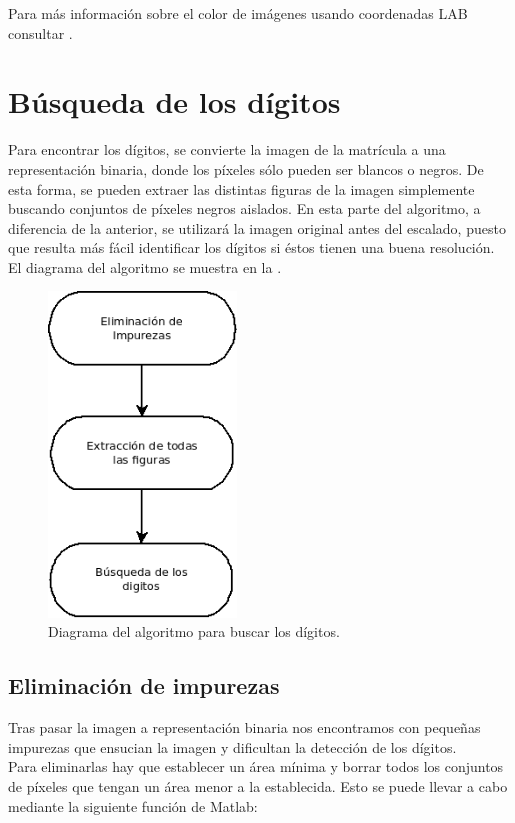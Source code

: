 Para más información sobre el color de imágenes usando coordenadas LAB consultar \cite{matlabLAB}.

\section{Búsqueda de los dígitos}
Para encontrar los dígitos, se convierte la imagen de la matrícula a una representación binaria, donde los píxeles sólo pueden ser blancos o negros. De esta forma, se pueden extraer las distintas figuras de la imagen simplemente buscando conjuntos de píxeles negros aislados. En esta parte del algoritmo, a diferencia de la anterior, se utilizará la imagen original antes del escalado, puesto que resulta más fácil identificar los dígitos si éstos tienen una buena resolución.\\

El diagrama del algoritmo se muestra en la .

\begin{figure}[!h]
\centering
\includegraphics[width=5cm]{Diagrama2.png}
\caption{\small{Diagrama del algoritmo para buscar los dígitos.}}
\label{Diagrama2}
\end{figure}

\subsection{Eliminación de impurezas}
Tras pasar la imagen a representación binaria nos encontramos con pequeñas impurezas que ensucian la imagen y dificultan la detección de los dígitos.\\


Para eliminarlas hay que establecer un área mínima y borrar todos los conjuntos de píxeles que tengan un área menor a la establecida. Esto se puede llevar a cabo mediante la siguiente función de Matlab:

